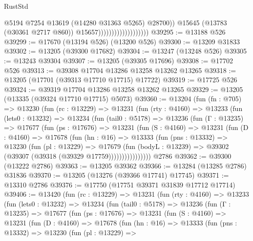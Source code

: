 \begin{lexlean}{RustStd}
\begin{coremodule}
                                              @5194
                                              @7254
                                              @13619
                                              (@14280 @31363 @5265)
                                              @28700))
                                          @15645
                                          (@13783 (@30361 @2717 @860))
                                          @15657)))))))))))))))))))
@39295 := @13188 @526
@39299 := @17670 (@13194 @526) (@13200 @526)
@39300 := @13209 @31833
@39302 := @13205 (@39300 @17682)
@39304 := @13247 (@13248 @526)
@39305 := @13243 @39304
@39307 := @13205 (@39305 @17696)
@39308 := @17702 @526
@39313 := @39308 @17704 @13286 @13258 @13262 @13265
@39318 := @13205 (@17701 (@39313 @17710 @17715) @17722)
@39319 := @17725 @526
@39324 := @39319 @17704 @13286 @13258 @13262 @13265
@39329 := @13205 (@13335 (@39324 @17710 @17715) @5073)
@39360 := @13204
    (fun (fn : @705) =>
    @13230
      (fun (rc : @13229) =>
      @13231
        (fun (rty : @4160) =>
        @13233
          (fun (lets0 : @13232) =>
          @13234
            (fun (tail0 : @5178) =>
            @13236
              (fun (Γ : @13235) =>
              @17677
                (fun (ps : @17676) =>
                @13231
                  (fun (S : @4160) =>
                  @13231
                    (fun (D : @4160) =>
                    @17678
                      (fun (hn : @16) =>
                      @13333
                        (fun (pns : @13332) =>
                        @13230
                          (fun (pl : @13229) =>
                          @17679
                            (fun (bodyL : @13239) =>
                            @39302 (@39307 (@39318 (@39329 @17759))))))))))))))))
    @2786
@39362 := @39300 (@13222 @2786)
@39363 := @13205 @39362
@39366 := @13284 (@13285 @2786) @31836
@39370 := @13205 (@13276 (@39366 @17741) @17745)
@39371 := @13310 @2786
@39376 := @17750 (@17751 @39371 @31839 @17712 @17714)
@39406 := @13420
    (fun (rc : @13229) =>
    @13231
      (fun (rty : @4160) =>
      @13233
        (fun (lets0 : @13232) =>
        @13234
          (fun (tail0 : @5178) =>
          @13236
            (fun (Γ : @13235) =>
            @17677
              (fun (ps : @17676) =>
              @13231
                (fun (S : @4160) =>
                @13231
                  (fun (D : @4160) =>
                  @17678
                    (fun (hn : @16) =>
                    @13333
                      (fun (pns : @13332) =>
                      @13230
                        (fun (pl : @13229) =>

\end{coremodule}
\end{lexlean}
